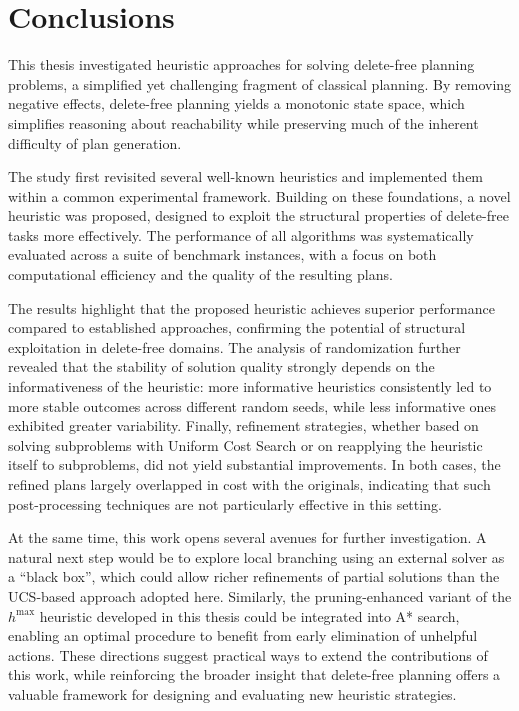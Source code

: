 \chapter{Conclusions}
This thesis investigated heuristic approaches for solving delete-free planning problems, a simplified yet challenging fragment of classical planning.
By removing negative effects, delete-free planning yields a monotonic state space, which simplifies reasoning about reachability while preserving
much of the inherent difficulty of plan generation.

The study first revisited several well-known heuristics and implemented them within a common experimental framework. Building on these foundations,
a novel heuristic was proposed, designed to exploit the structural properties of delete-free tasks more effectively. The performance of all algorithms
was systematically evaluated across a suite of benchmark instances, with a focus on both computational efficiency and the quality of the resulting plans.

The results highlight that the proposed heuristic achieves superior performance compared to established approaches,
confirming the potential of structural exploitation in delete-free domains. The analysis of randomization further revealed that the stability of solution
quality strongly depends on the informativeness of the heuristic: more informative heuristics consistently led to more stable outcomes across different
random seeds, while less informative ones exhibited greater variability. Finally, refinement strategies, whether based on solving subproblems with
Uniform Cost Search or on reapplying the heuristic itself to subproblems, did not yield substantial improvements. In both cases,
the refined plans largely overlapped in cost with the originals, indicating that such post-processing techniques are not particularly effective in this setting.

At the same time, this work opens several avenues for further investigation. A natural next step would be to explore local branching using an external
solver as a ``black box'', which could allow richer refinements of partial solutions than the \textsc{UCS}-based approach adopted here.
Similarly, the pruning-enhanced variant of the $h^{\max}$ heuristic developed in this thesis could be integrated into \textsc{A*} search, enabling an optimal procedure
to benefit from early elimination of unhelpful actions. These directions suggest practical ways to extend the contributions of this work,
while reinforcing the broader insight that delete-free planning offers a valuable framework for designing and evaluating new heuristic strategies.
